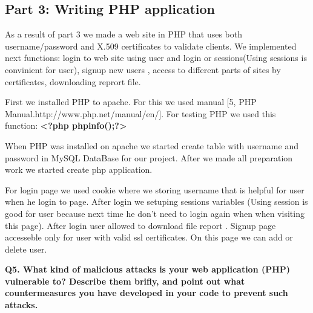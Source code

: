 \subsection {Part 3: Writing PHP application}


\noindent
As a result of part 3 we made a web site in PHP that uses both username/password and X.509 certificates to validate clients. We implemented next functions: login to web site using user and login or sessions(Using sessions is convinient for user), signup new users , access to different parts of sites by certificates, downloading reprort file.
\newline

\noindent
First we installed PHP to apache. For this  we used manual [5,  PHP Manual.http://www.php.net/manual/en/]. For testing PHP we used this function: {\bf <?php phpinfo();?>}
\newline

\noindent
When PHP was installed on apache we started  create table  with username and password  in MySQL DataBase for our project. After we made all preparation work we started create php application. 
\newline

\noindent
For login page we used cookie where we storing username that is helpful for user when he login to page. After login we setuping sessions variables (Using session is good for user because next time he don’t need to login again when when visiting this page). After login user allowed to download file report . Signup page accesseble  only for user with valid ssl certificates. On this page we can add or delete user.
\newline

{\bf Q5. What kind of malicious attacks is your web application (PHP) vulnerable to? Describe them brifly, and point out what countermeasures you have
developed in your code to prevent such attacks.}









